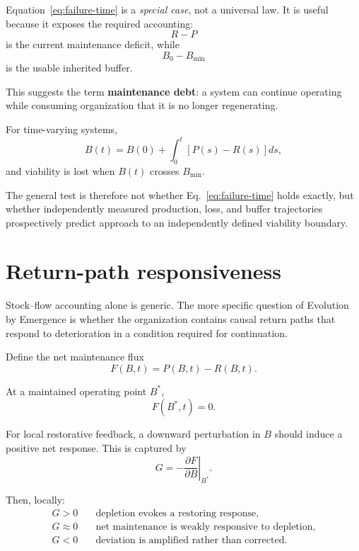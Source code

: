 \documentclass[11pt,a4paper]{article}
\begin{document}
Equation~\eqref{eq:failure-time} is a \emph{special case}, not a universal law. It is useful because it exposes the required accounting:
\[
R-P
\]
is the current maintenance deficit, while
\[
B_0-B_{\min}
\]
is the usable inherited buffer.

This suggests the term \textbf{maintenance debt}: a system can continue operating while consuming organization that it is no longer regenerating.

For time-varying systems,
\begin{equation}
B(t)
=
B(0)
+
\int_0^t\left[P(s)-R(s)\right]ds,
\label{eq:time-varying-buffer}
\end{equation}
and viability is lost when $B(t)$ crosses $B_{\min}$.

The general test is therefore not whether Eq.~\eqref{eq:failure-time} holds exactly, but whether independently measured production, loss, and buffer trajectories prospectively predict approach to an independently defined viability boundary.

\section{Return-path responsiveness}

Stock--flow accounting alone is generic. The more specific question of Evolution by Emergence is whether the organization contains causal return paths that respond to deterioration in a condition required for continuation.

Define the net maintenance flux
\begin{equation}
F(B,t)=P(B,t)-R(B,t).
\label{eq:net-flux}
\end{equation}

At a maintained operating point $B^\ast$,
\[
F(B^\ast,t)=0.
\]

For local restorative feedback, a downward perturbation in $B$ should induce a positive net response. This is captured by
\begin{equation}
\boxed{
G
=
-\left.
\frac{\partial F}{\partial B}
\right|_{B^\ast}.
}
\label{eq:restorative-gain}
\end{equation}

Then, locally:
\begin{align*}
G>0 &\quad \text{depletion evokes a restoring response},\\
G\approx0 &\quad \text{net maintenance is weakly responsive to depletion},\\
G<0 &\quad \text{deviation is amplified rather than corrected}.
\end{align*}
\end{document}
